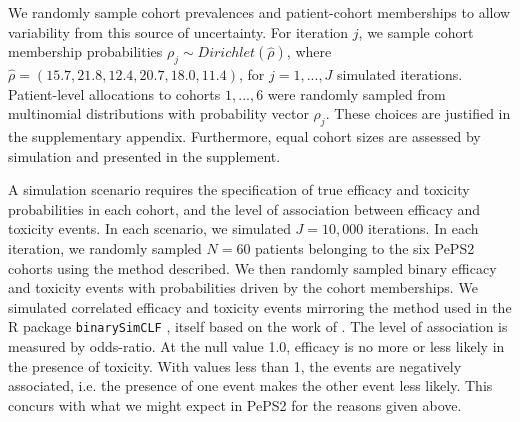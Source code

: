 \documentclass[alpha-refs]{wiley-article}
\begin{document}
We randomly sample cohort prevalences and patient-cohort memberships to allow variability from this source of uncertainty.
For iteration $j$, we sample cohort membership probabilities $\rho_j \sim Dirichlet(\hat{\rho})$, where $\hat{\rho} = (15.7, 21.8, 12.4, 20.7, 18.0, 11.4)$, for $j=1,...,J$ simulated iterations.
Patient-level allocations to cohorts $1,...,6$ were randomly sampled from multinomial distributions with probability vector $\rho_j$.
These choices are justified in the supplementary appendix.
Furthermore, equal cohort sizes are assessed by simulation and presented in the supplement.

A simulation scenario requires the specification of true efficacy and toxicity probabilities in each cohort, and the level of association between efficacy and toxicity events.
In each scenario, we simulated $J=10,000$ iterations.
In each iteration, we randomly sampled $N=60$ patients belonging to the six PePS2 cohorts using the method described.
We then randomly sampled binary efficacy and toxicity events with probabilities driven by the cohort memberships.
We simulated correlated efficacy and toxicity events mirroring the method used in the R package \texttt{binarySimCLF} \citep{binarySimCLF}, itself based on the work of \cite{Qaqish2003}.
The level of association is measured by odds-ratio. 
At the null value 1.0, efficacy is no more or less likely in the presence of toxicity.
With values less than 1, the events are negatively associated, i.e. the presence of one event makes the other event less likely.
This concurs with what we might expect in PePS2 for the reasons given above.
\end{document}
